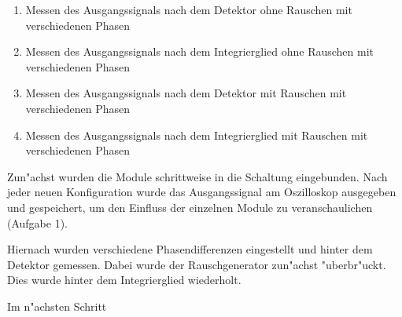 \documentclass{scrartcl}
\begin{document}
\begin{enumerate}
\item \label{a1} Messen des Ausgangssignals nach dem Detektor ohne Rauschen mit verschiedenen Phasen
\item \label{a2} Messen des Ausgangssignals nach dem Integrierglied ohne Rauschen mit verschiedenen Phasen
\item \label{a3} Messen des Ausgangssignals nach dem Detektor mit Rauschen mit verschiedenen Phasen
\item \label{a4} Messen des Ausgangssignals nach dem Integrierglied mit Rauschen mit verschiedenen Phasen
\end{enumerate}

	Zun"achst wurden die Module schrittweise in die Schaltung eingebunden.
	Nach jeder neuen Konfiguration wurde das Ausgangssignal am Oszilloskop ausgegeben und gespeichert,
	um den Einfluss der einzelnen Module zu veranschaulichen (Aufgabe 1).

	Hiernach wurden verschiedene Phasendifferenzen eingestellt und hinter dem Detektor gemessen.
	Dabei wurde der Rauschgenerator zun"achst "uberbr"uckt.
	Dies wurde hinter dem Integrierglied wiederholt.

	Im n"achsten Schritt 
\end{document}
